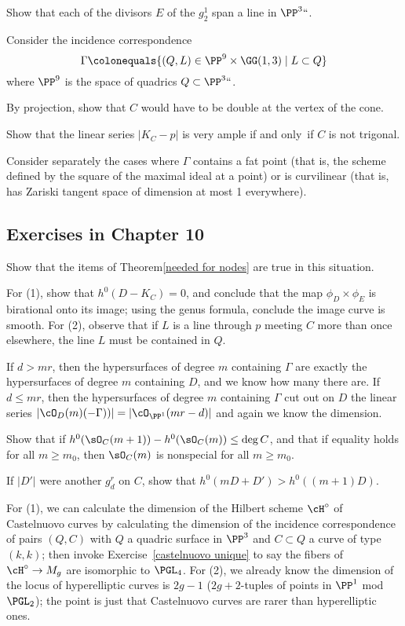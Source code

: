 Show that each of the divisors $E$ of the $g^1_2$ span a line in $\PP^3` `$.

Consider the incidence correspondence
$$
\Gamma \colonequals  \{ (Q, L) \in \PP^9 \times \GG(1,3) \mid L \subset Q \}
$$
where $\PP^9$ is the space of quadrics $Q\subset \PP^3` `$.

By projection, show that $C$ would have to be double at the vertex of the cone.

Show that the linear series $|K_C - p|$ is very ample if and only~if
$C$ is not trigonal.

Consider separately the cases where $\Gamma$ contains a fat point
%
(that is, the scheme defined by the square of the maximal ideal at a
point) or is
curvilinear
%
(that is, has Zariski tangent space of
dimension at most 1 everywhere).

\subsection*{Exercises in Chapter 10}

Show that the items of Theorem\ref{needed for nodes}  are true in this
situation.

For (1), show that $h^0(D - K_C) = 0$, and conclude
that the map $\phi_D \times \phi_E$ is birational onto its image;
using
the genus formula, conclude the image curve is smooth. For (2),
observe that if $L$ is a line through $p$ meeting $C$ more than
once elsewhere, the line $L$ must be contained in $Q$.

If $d > mr$, then the hypersurfaces of degree $m$ containing
$\Gamma$ are exactly the hypersurfaces of degree $m$ containing $D$,
and we know how many there are. If $d \leq mr$, then the hypersurfaces
of degree $m$ containing $\Gamma$ cut out on $D$ the linear series
$|\cO_D(m)(-\Gamma))| = |\cO_{\PP^1}(mr-d)|$ and again we know the
dimension.

Show that if $h^{0}(\sO_{C}(m+1))-h^{0}(\sO_{C}(m)) \leq \deg C$,
and that if equality holds for
all $m\geq m_{0}$, then $\sO_{C}(m) $ is nonspecial for all $m\geq m_{0}$.

If $|D'|$ were another $g^r_d$ on $C$, show that $h^0(mD + D') > h^0((m+1)D)$.

For (1), we can calculate the dimension of the Hilbert scheme $\cH^\circ$ of
Castelnuovo curves
%
by calculating the dimension
of the incidence correspondence of pairs $(Q, C)$ with $Q$ a quadric
surface in $\PP^3$ and $C \subset Q$ a curve of type $(k,k)$; then invoke
Exercise~\ref{castelnuovo unique} to say the fibers of $\cH^\circ \to
M_g$ are isomorphic to
%
%
$\PGL_4$.
For (2), we already know the
dimension of the locus of hyperelliptic curves is $2g-1$ ($2g+2$-tuples
of points in $\PP^1$ mod $\PGL_2$); the point is just that Castelnuovo
curves are rarer than hyperelliptic ones.

